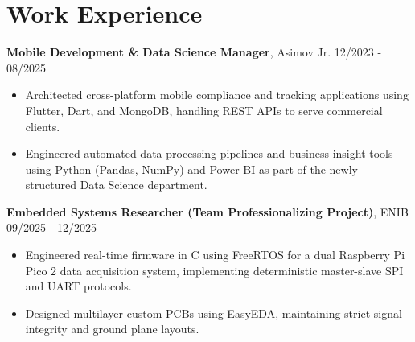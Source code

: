 \documentclass[10pt,a4paper]{article}
\begin{document}
\section{Work Experience}
\noindent
\textbf{\color{primary} Mobile Development \& Data Science Manager}, Asimov Jr. \hfill {\small\color{subtext} 12/2023 - 08/2025}
\begin{itemize}
    \item \small Architected cross-platform mobile compliance and tracking applications using Flutter, Dart, and MongoDB, handling REST APIs to serve commercial clients.
    \item \small Engineered automated data processing pipelines and business insight tools using Python (Pandas, NumPy) and Power BI as part of the newly structured Data Science department.
\end{itemize}
\noindent
\textbf{\color{primary} Embedded Systems Researcher (Team Professionalizing Project)}, ENIB \hfill {\small\color{subtext} 09/2025 - 12/2025}
\begin{itemize}
    \item \small Engineered real-time firmware in C using FreeRTOS for a dual Raspberry Pi Pico 2 data acquisition system, implementing deterministic master-slave SPI and UART protocols.
    \item \small Designed multilayer custom PCBs using EasyEDA, maintaining strict signal integrity and ground plane layouts.
\end{itemize}

\end{document}
